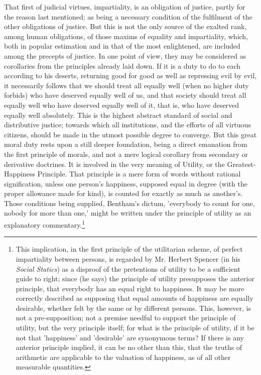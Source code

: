 \documentclass[12pt]{report}
\begin{document}
That first of judicial virtues, impartiality, is an obligation of justice, partly for the reason last mentioned; as being a necessary condition of the fulfilment of the other obligations of justice. But this is not the only source of the exalted rank, among human obligations, of those maxims of equality and impartiality, which, both in popular estimation and in that of the most enlightened, are included among the precepts of justice. In one point of view, they may be considered as corollaries from the principles already laid down. If it is a duty to do to each according to his deserts, returning good for good as well as repressing evil by evil, it necessarily follows that we should treat all equally well (when no higher duty forbids) who have deserved equally well of us, and that society should treat all equally well who have deserved equally well of it, that is, who have deserved equally well absolutely. This is the highest abstract standard of social and distributive justice; towards which all institutions, and the efforts of all virtuous citizens, should be made in the utmost possible degree to converge. But this great moral duty rests upon a still deeper foundation, being a direct emanation from the first principle of morals, and not a mere logical corollary from secondary or derivative doctrines. It is involved in the very meaning of Utility, or the Greatest-Happiness Principle. That principle is a mere form of words without rational signification, unless one person's happiness, supposed equal in degree (with the proper allowance made for kind), is counted for exactly as much as another's. Those conditions being supplied, Bentham's dictum, 'everybody to count for one, nobody for more than one,' might be written under the principle of utility as an explanatory commentary.\footnote{This implication, in the first principle of the utilitarian scheme, of perfect impartiality between persons, is regarded by Mr. Herbert Spencer (in his \emph{Social Statics}) as a disproof of the pretentions of utility to be a sufficient guide to right; since (he says) the principle of utility presupposes the anterior principle, that everybody has an equal right to happiness. It may be more correctly described as supposing that equal amounts of happiness are equally desirable, whether felt by the same or by different persons. This, however, is not a pre-supposition; not a premise needful to support the principle of utility, but the very principle itself; for what is the principle of utility, if it be not that 'happiness' and 'desirable' are synonymous terms? If there is any anterior principle implied, it can be no other than this, that the truths of arithmetic are applicable to the valuation of happiness, as of all other measurable quantities.

}
\end{document}
